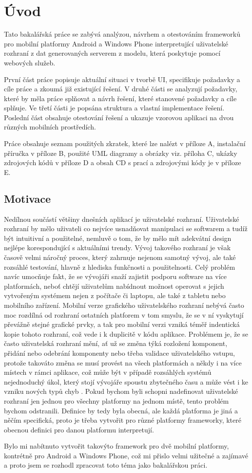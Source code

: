 \chapter{Úvod}
Tato bakalářská práce se zabývá analýzou, návrhem a otestováním frameworků pro mobilní platformy Android a Windows Phone interpretující uživatelské rozhraní z dat generovaných serverem z modelu, která poskytuje pomocí webových služeb.

První část práce popisuje aktuální situaci v tvorbě UI, specifikuje požadavky a cíle práce a zkoumá již existující řešení. V druhé části se analyzují požadavky, které by měla práce splňovat a návrh řešení, které stanovené požadavky a cíle splňuje. Ve třetí části je popsána struktura a vlastní implementace řešení. Poslední část obsahuje otestování řešení a ukazuje vzorovou aplikaci na dvou různých mobilních prostředích.

Práce obsahuje seznam použitých zkratek, které lze nalézt v příloze A, instalační příručka v příloze B, použité UML diagramy a obrázky viz. příloha C, ukázky zdrojových kódů v příloze D a obsah CD s prací a zdrojovými kódy je v příloze E.
 

\section{Motivace}
Nedílnou součástí většiny dnešních aplikací je uživatelské rozhraní. Uživatelské rozhraní by mělo uživateli co nejvíce usnadňovat manipulaci se softwarem a tudíž být intuitivní a použitelné, nemluvě o tom, že by mělo mít adekvátní design nejlépe korespondující s aktuálními trendy. Vývoj takového rozhraní je však časově velmi náročný proces, který zahrnuje nejenom samotný vývoj, ale také rozsáhlé testování, hlavně z hlediska funkčnosti a použitelnosti. Celý problém navíc umocňuje fakt, že se vývojáři snaží zajistit podporu software na více platformách, neboť chtějí uživatelům nabídnout možnost operovat s jejich vytvořeným systémem nejen z počítače či laptopu, ale také z tabletu nebo mobilního zařízení. Mobilní verze grafického uživatelského rozhraní nebývá často moc rozdílná od rozhraní ostatních platforem v tom smyslu, že se v ní vyskytují převážně stejné grafické prvky, a tak pro mobilní verzi vzniká téměř indentická kopie tohoto rozhraní, což vede i k duplicitě v kódu aplikace. Problémem je, že se často uživatelská rozhraní mění, ať už se změna týká rozložení komponent, přidání nebo odebrání komponenty nebo třeba validace uživatelského vstupu, protože takováto změna se musí provést na všech platformách a někdy i na více místech v rámci aplikace, což může být v případě rozsáhlých systémů nejednoduchý úkol, který stojí vývojáře spoustu zbytečného času a může vést i ke vzniku nových typů chyb \cite{towards-smart-design}. Pokud bychom byli schopni nadefinovat uživatelské rozhraní jen jednou pro všechny platformy na jednom místě, tento problém bychom odstranili. Definice by tedy byla obecná, ale každá platforma je jiná a něčím specifická, proto je třeba vytvořit pro různé platformy frameworky, které obecnou definici pro danou platformu interpretují. 

Bylo mi nabítnuto vytvořit takovýto framework pro dvě mobilní platformy, kontrétně pro Android a Windows Phone, což mi přislo velmi užitečné a zajímavé a proto jsem se rozhodl zpracovat toto téma jako bakalářskou práci.
